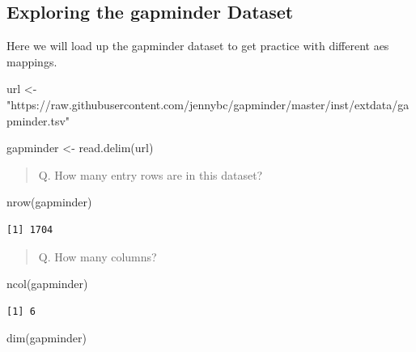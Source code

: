 \documentclass[
  letterpaper,
  DIV=11,
  numbers=noendperiod]{scrartcl}
\newenvironment{Shaded}{\begin{snugshade}}{\end{snugshade}}
\newcommand{\FunctionTok}[1]{\textcolor[rgb]{0.28,0.35,0.67}{#1}}
\newcommand{\NormalTok}[1]{\textcolor[rgb]{0.00,0.23,0.31}{#1}}
\newcommand{\OtherTok}[1]{\textcolor[rgb]{0.00,0.23,0.31}{#1}}
\newcommand{\StringTok}[1]{\textcolor[rgb]{0.13,0.47,0.30}{#1}}
\begin{document}
\hypertarget{exploring-the-gapminder-dataset}{%
\subsection{Exploring the gapminder
Dataset}\label{exploring-the-gapminder-dataset}}

Here we will load up the gapminder dataset to get practice with
different aes mappings.

\begin{Shaded}
\begin{Highlighting}[]
\NormalTok{url }\OtherTok{\textless{}{-}} \StringTok{"https://raw.githubusercontent.com/jennybc/gapminder/master/inst/extdata/gapminder.tsv"}

\NormalTok{gapminder }\OtherTok{\textless{}{-}} \FunctionTok{read.delim}\NormalTok{(url)}
\end{Highlighting}
\end{Shaded}

\begin{quote}
Q. How many entry rows are in this dataset?
\end{quote}

\begin{Shaded}
\begin{Highlighting}[]
\FunctionTok{nrow}\NormalTok{(gapminder)}
\end{Highlighting}
\end{Shaded}

\begin{verbatim}
[1] 1704
\end{verbatim}

\begin{quote}
Q. How many columns?
\end{quote}

\begin{Shaded}
\begin{Highlighting}[]
\FunctionTok{ncol}\NormalTok{(gapminder)}
\end{Highlighting}
\end{Shaded}

\begin{verbatim}
[1] 6
\end{verbatim}

\begin{Shaded}
\begin{Highlighting}[]
\FunctionTok{dim}\NormalTok{(gapminder)}
\end{Highlighting}
\end{Shaded}
\end{document}
